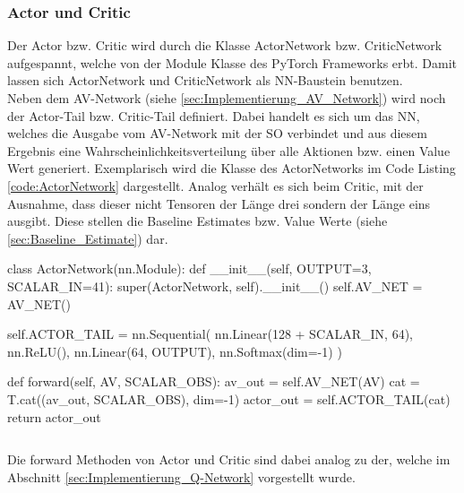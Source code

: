 \subsubsection{Actor und Critic}
Der Actor bzw. Critic wird durch die Klasse ActorNetwork bzw. CriticNetwork aufgespannt, welche von der Module Klasse des PyTorch Frameworks erbt. Damit lassen sich ActorNetwork und CriticNetwork als NN-Baustein benutzen.\\
Neben dem AV-Network (siehe \ref{sec:Implementierung_AV_Network}) wird noch der Actor-Tail bzw. Critic-Tail definiert. Dabei handelt es sich um das NN, welches die Ausgabe vom AV-Network mit der SO verbindet und aus diesem Ergebnis eine Wahrscheinlichkeitsverteilung über alle Aktionen bzw. einen Value Wert generiert. 
Exemplarisch wird die Klasse des ActorNetworks im Code Listing \ref{code:ActorNetwork} dargestellt. Analog verhält es sich beim Critic, mit der Ausnahme, dass dieser nicht Tensoren der Länge drei sondern der Länge eins ausgibt. Diese stellen die Baseline Estimates bzw. Value Werte (siehe \ref{sec:Baseline_Estimate}) dar.
\begin{python}
class ActorNetwork(nn.Module):
	def __init__(self, OUTPUT=3, SCALAR_IN=41):
		super(ActorNetwork, self).__init__()
		self.AV_NET = AV_NET()
			
		self.ACTOR_TAIL = nn.Sequential(
			nn.Linear(128 + SCALAR_IN, 64),
			nn.ReLU(),
			nn.Linear(64, OUTPUT),
			nn.Softmax(dim=-1)
		)
		
	def forward(self, AV, SCALAR_OBS):
		av_out = self.AV_NET(AV)
		cat = T.cat((av_out, SCALAR_OBS), dim=-1)
		actor_out = self.ACTOR_TAIL(cat)
		return actor_out
\end{python}
\begin{lstlisting}[caption=ActorNetwork, label=code:ActorNetwork]
\end{lstlisting}

Die forward Methoden von Actor und Critic sind dabei analog zu der, welche im Abschnitt \ref{sec:Implementierung_Q-Network} vorgestellt wurde.

